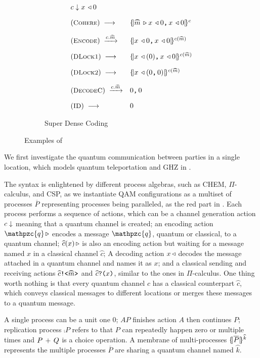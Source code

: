 \begin{figure}[t]
{\begin{subfigure}[t]{0.38\textwidth}
{\[\begin{array}{l}
\begin{array}{ll}
{\down{c}{\decode{x}{0}}
}
\\[1em]
(\rulelab{Cohere})\;
\longrightarrow
&
\pscell{\pard{\encode{\wideparen{m}}\decode{x}{0}}{\decode{x}{0}}}{c}
\\[1em]
(\rulelab{Encode})\;
\xrightarrow{c.\wideparen{m}}
&
\pscell{\pard{\decode{x}{0}}{\decode{x}{0}}}{c(\wideparen{m})}
\\[1em]
(\rulelab{DLock1})\;
\longrightarrow
&
\pscell{\pard{\decode{x}{(0)}}{\decode{x}{0}}}{c(\wideparen{m})}
\\[1em]
(\rulelab{DLock2})\;
\longrightarrow
&
\pscell{\decode{x}{(\pard{0}{0})}}{c(\wideparen{m})}
\\[1em]
(\rulelab{DecodeC})\;
\xrightarrow{c.\wideparen{m}}
&
\pard{{0}}{{0}}
\\[1em]
(\rulelab{ID})\;
\longrightarrow
&
0
\end{array}
\end{array}
\]
}
\caption{Super Dense Coding}
  \label{fig:super-example}
\end{subfigure}
}
\caption{Examples of }
\end{figure}

We first investigate the quantum communication between parties in a single location, which models quantum teleportation and GHZ in .

The syntax is enlightened by different process algebras, such as CHEM, $\Pi$-calculus, and CSP,
as we instantiate QAM configurations as a multiset of processes $\overline{P}$ representing processes being paralleled,
as the red part in .
Each process performs a sequence of actions, which can be
a channel generation action $c\downarrow$ meaning that a quantum channel is created;
an encoding action $\encode{\mathpzc{q}}$ encodes a message $\mathpzc{q}$, quantum or classical, to a quantum channel;
$\encode{\wideparen{c}(x)}$ is also an encoding action but waiting for a message named $x$ in a classical channel $\wideparen{c}$;
A decoding action $x\,\triangleleft$ decodes the message attached in a quantum channel and names it as $x$;
and a classical sending and receiving actions
$\csenda{\wideparen{c}}{\wideparen{m}}$ and $\creva{\wideparen{c}}{x}$, similar to the ones in $\Pi$-calculus.
One thing worth nothing is that every quantum channel $c$ has a classical counterpart $\wideparen{c}$,
which conveys classical messages to different locations or merges these messages to a quantum message.

A single process can be a unit one $0$; $AP$ finishes action $A$ then continues $P$;
replication process $\comp{P}$ refers to that $P$ can repeatedly happen zero or multiple times
and $P\,+\,Q$ is a choice operation.
A membrane of multi-processes $\pscell{\overline{P}}{\wideparen{k}}$ represents the multiple processes $\overline{P}$ are sharing a quantum channel named $\wideparen{k}$.

